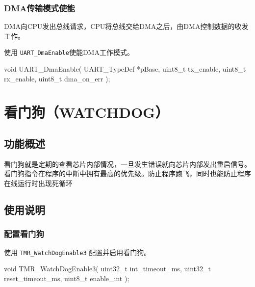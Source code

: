 \documentclass[
  12pt,
]{book}
\newenvironment{Shaded}{\begin{snugshade}}{\end{snugshade}}
\newcommand{\DataTypeTok}[1]{\textcolor[rgb]{0.13,0.29,0.53}{#1}}
\newcommand{\NormalTok}[1]{#1}
\begin{document}
\hypertarget{dmaux4f20ux8f93ux6a21ux5f0fux4f7fux80fd}{%
\subsection{DMA传输模式使能}\label{dmaux4f20ux8f93ux6a21ux5f0fux4f7fux80fd}}

DMA向CPU发出总线请求，CPU将总线交给DMA之后，由DMA控制数据的收发工作。

使用 \texttt{UART\_DmaEnable}使能DMA工作模式。

\begin{Shaded}
\begin{Highlighting}[]
\DataTypeTok{void}\NormalTok{ UART_DmaEnable(}
\NormalTok{  UART_TypeDef *pBase, }
  \DataTypeTok{uint8_t}\NormalTok{ tx_enable, }
  \DataTypeTok{uint8_t}\NormalTok{ rx_enable, }
  \DataTypeTok{uint8_t}\NormalTok{ dma_on_err}
\NormalTok{  );}
\end{Highlighting}
\end{Shaded}

\hypertarget{ch-watchdog}{%
\chapter{看门狗（WATCHDOG）}\label{ch-watchdog}}

\hypertarget{ux529fux80fdux6982ux8ff0-7}{%
\section{功能概述}\label{ux529fux80fdux6982ux8ff0-7}}

看门狗就是定期的查看芯片内部情况，一旦发生错误就向芯片内部发出重启信号。
看门狗指令在程序的中断中拥有最高的优先级。防止程序跑飞，同时也能防止程序在线运行时出现死循环

\hypertarget{ux4f7fux7528ux8bf4ux660e-8}{%
\section{使用说明}\label{ux4f7fux7528ux8bf4ux660e-8}}

\hypertarget{ux914dux7f6eux770bux95e8ux72d7}{%
\subsection{配置看门狗}\label{ux914dux7f6eux770bux95e8ux72d7}}

使用 \texttt{TMR\_WatchDogEnable3} 配置并启用看门狗。

\begin{Shaded}
\begin{Highlighting}[]
\DataTypeTok{void}\NormalTok{ TMR_WatchDogEnable3(}
  \DataTypeTok{uint32_t}\NormalTok{ int_timeout_ms, }
  \DataTypeTok{uint32_t}\NormalTok{ reset_timeout_ms, }
  \DataTypeTok{uint8_t}\NormalTok{ enable_int}
\NormalTok{  );}
\end{Highlighting}
\end{Shaded}
\end{document}
